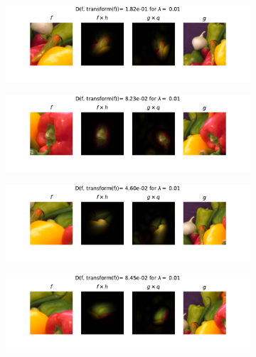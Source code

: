 \begin{figure}[!h]
    \centering
    \begin{subfigure}{0.60\textwidth}
    \includegraphics[width=\textwidth]{ch1-diffy/figures/fig_peppers/appendix_match_0.01_14.pdf}
    \end{subfigure}
    \begin{subfigure}{0.60\textwidth}
    \includegraphics[width=\textwidth]{ch1-diffy/figures/fig_peppers/appendix_match_0.01_19.pdf}
    \end{subfigure}
    \begin{subfigure}{0.60\textwidth}
    \includegraphics[width=\textwidth]{ch1-diffy/figures/fig_peppers/appendix_match_0.01_8.pdf}
    \end{subfigure}
    \begin{subfigure}{0.60\textwidth}
    \includegraphics[width=\textwidth]{ch1-diffy/figures/fig_peppers/appendix_match_0.01_9.pdf}

\end{subfigure}
\end{figure}
